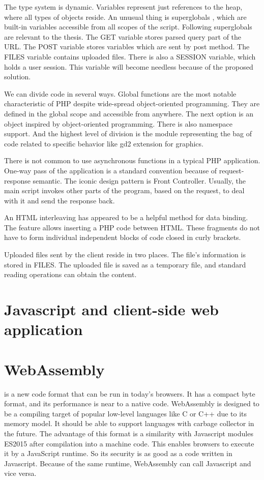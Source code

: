 The type system is dynamic.
Variables represent just references to the heap, where all types of objects reside.
An unusual thing is superglobals \cite{6}, which are built-in variables accessible from all scopes of the script.
Following superglobals are relevant to the thesis.
The GET variable stores parsed query part of the URL.
The POST variable stores variables which are sent by post method.
The FILES variable contains uploaded files.
There is also a SESSION variable, which holds a user session.
This variable will become needless because of the proposed solution.

We can divide code in several ways.
Global functions are the most notable characteristic of PHP despite wide-spread object-oriented programming.
They are defined in the global scope and accessible from anywhere.
The next option is an object inspired by object-oriented programming.
There is also namespace support.
And the highest level of division is the module representing the bag of code related to specific behavior like gd2 extension for graphics.

There is not common to use asynchronous functions in a typical PHP application.
One-way pass of the application is a standard convention because of request-response semantic.
The iconic design pattern is Front Controller.
Usually, the main script invokes other parts of the program, based on the request, to deal with it and send the response back.

An HTML interleaving has appeared to be a helpful method for data binding.
The feature allows inserting a PHP code between HTML.
These fragments do not have to form individual independent blocks of code closed in curly brackets.

Uploaded files sent by the client reside in two places.
The file's information is stored in FILES.
The uploaded file is saved as a temporary file, and standard reading operations can obtain the content.

\section{Javascript and client-side web application}



\section{WebAssembly}

\cite{WebAssembly} is a new code format that can be run in today's browsers. 
It has a compact byte format, and its performance is near to a native code. 
WebAssembly is designed to be a compiling target of popular low-level languages like C or C++ due to its memory model. 
It should be able to support languages with carbage collector in the future. 
The advantage of this format is a similarity with Javascript modules ES2015 after compilation into a machine code. 
This enables browsers to execute it by a JavaScript runtime. 
So its security is as good as a code written in Javascript. 
Because of the same runtime, WebAssembly can call Javascript and vice versa.

